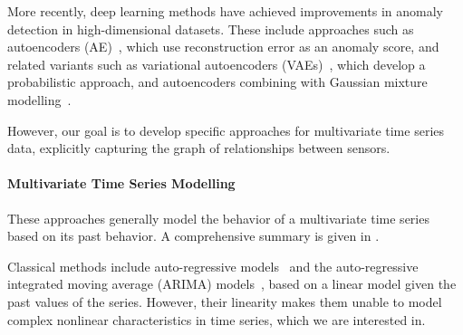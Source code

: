 \documentclass[letterpaper]{article} %
\begin{document}
More recently, deep learning methods have achieved improvements in anomaly detection in high-dimensional datasets. These include approaches such as autoencoders (AE)~\cite{autoencoding}, which use reconstruction error as an anomaly score, and related variants such as variational autoencoders (VAEs)~\cite{vae}, which develop a probabilistic approach, and autoencoders combining with Gaussian mixture modelling~\cite{dagmm}. 

However, our goal is to develop specific approaches for multivariate time series data, explicitly capturing the graph of relationships between sensors.


\paragraph{Multivariate Time Series Modelling}  
These approaches generally model the behavior of a multivariate time series based on its past behavior. A comprehensive summary is given in \cite{survey_timeseries}.



Classical methods include auto-regressive models~\cite{hautamaki2004outlier} and the auto-regressive integrated moving average (ARIMA) models~\cite{arima_1, arima_2}, based on a linear model given the past values of the series. However, their linearity makes them unable to model complex nonlinear characteristics in time series, which we are interested in.
\end{document}
